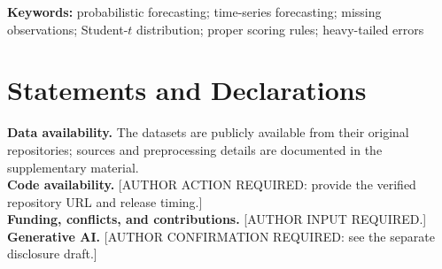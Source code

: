 \documentclass[11pt]{article}
\begin{document}

\begin{abstract}

\end{abstract}
\noindent\textbf{Keywords:} probabilistic forecasting; time-series forecasting; missing observations; Student-$t$ distribution; proper scoring rules; heavy-tailed errors












\section*{Statements and Declarations}
\textbf{Data availability.} The datasets are publicly available from their original repositories; sources and preprocessing details are documented in the supplementary material.\\
\textbf{Code availability.} [AUTHOR ACTION REQUIRED: provide the verified repository URL and release timing.]\\
\textbf{Funding, conflicts, and contributions.} [AUTHOR INPUT REQUIRED.]\\
\textbf{Generative AI.} [AUTHOR CONFIRMATION REQUIRED: see the separate disclosure draft.]


\end{document}
